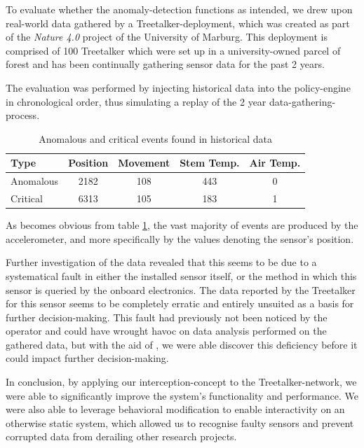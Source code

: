 To evaluate whether the anomaly-detection functions as intended, we drew upon real-world data gathered by a Treetalker-deployment, which was created as part of the \textit{Nature 4.0} project of the University of Marburg.
This deployment is comprised of 100 Treetalker which were set up in a university-owned parcel of forest and has been continually gathering sensor data for the past 2 years.

The evaluation was performed by injecting historical data into the policy-engine in chronological order, thus simulating a replay of the 2 year data-gathering-process.

\begin{table}[tb]
    \centering
    \caption{Anomalous and critical events found in historical data}
    \label{tab:evaluation:anomalies}
    \begin{tabular}{lcccc}
        \toprule
        Type & Position & Movement & Stem Temp. & Air Temp.  \\ \midrule
        Anomalous & 2182 & 108 & 443 & 0 \\
        Critical & 6313 & 105 & 183 & 1 \\
        \bottomrule
    \end{tabular}
\end{table}

As becomes obvious from table \ref{tab:evaluation:anomalies}, the vast majority of events are produced by the accelerometer, and more specifically by the values denoting the sensor's position.

Further investigation of the data revealed that this seems to be due to a systematical fault in either the installed sensor itself, or the method in which this sensor is queried by the onboard electronics.
The data reported by the Treetalker for this sensor seems to be completely erratic and entirely unsuited as a basis for further decision-making.
This fault had previously not been noticed by the operator and could have wrought havoc on data analysis performed on the gathered data, but with the aid of \ttt, we were able discover this deficiency before it could impact further decision-making.

In conclusion, by applying our interception-concept to the Treetalker-network, we were able to significantly improve the system's functionality and performance.
We were also able to leverage behavioral modification to enable interactivity on an otherwise static system, which allowed us to recognise faulty sensors and prevent corrupted data from derailing other research projects.
